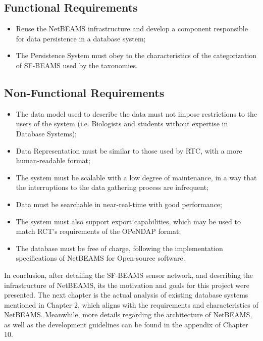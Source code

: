 \subsection{Functional Requirements}

\begin{itemize}
  \item Reuse the NetBEAMS infrastructure and develop a component responsible
  for data persistence in a database system;
  \item The Persistence System must obey to the characteristics of the
  categorization of SF-BEAMS used by the taxonomies.
\end{itemize}

\subsection{Non-Functional Requirements}

\begin{itemize}
  \item The data model used to describe the data must not impose restrictions
  to the users of the system (i.e. Biologists and students without expertise in
  Database Systems);
  \item Data Representation must be similar to those used by RTC, with a
  more human-readable format;
  \item The system must be scalable with a low degree of maintenance, in a
  way that the interruptions to the data gathering process are infrequent;
  \item Data must be searchable in near-real-time with good performance;
  \item The system must also support export capabilities, which may
  be used to match RCT's requirements of the OPeNDAP format;
  \item The database must be free of charge, following the
  implementation specifications of NetBEAMS for Open-source software.
\end{itemize}

In conclusion, after detailing the SF-BEAMS sensor network, and describing the 
infrastructure of NetBEAMS, its the motivation and goals for this project were 
presented. The next chapter is the actual analysis of existing database systems 
mentioned in Chapter 2, which aligns with the requirements and characteristics of 
NetBEAMS. Meanwhile, more details regarding the architecture of NetBEAMS, as well as
the development guidelines can be found in the appendix of Chapter 10.
